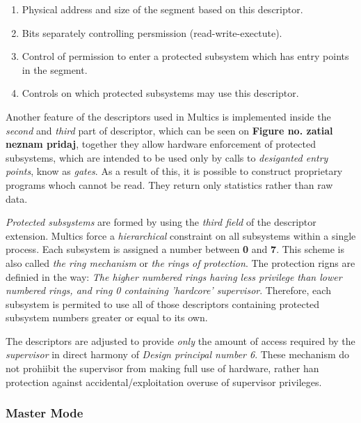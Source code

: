 
\begin{enumerate}
    \item Physical address and size of the segment based on this descriptor.
    \item Bits separately controlling persmission (read-write-exectute).
    \item Control of permission to enter a protected subsystem which has entry points in the segment.
    \item Controls on which protected subsystems may use this descriptor.
\end{enumerate}

Another feature of the descriptors used in Multics is implemented inside the \textit{second} and \textit{third} part of descriptor, 
which can be seen on \textbf{Figure no. zatial neznam pridaj}, together they allow hardware enforcement of protected subsystems, 
which are intended to be used only by calls to \textit{desiganted entry points}, know as \textit{gates}. As a result of this, 
it is possible to construct proprietary programs whoch cannot be read. They return only statistics rather than raw data.

\textit{Protected subsystems} are formed by using the \textit{third field} of the descriptor extension. Multics force a 
\textit{hierarchical} constraint on all subsystems within a single process. Each subsystem is assigned a number between 
\textbf{0} and \textbf{7}. This scheme is also called \textit{the ring mechanism} or \textit{the rings of protection}. 
The protection rigns are definied in the way:
\textit{The higher numbered rings having less privilege than lower numbered rings, and ring 0
containing 'hardcore' supervisor}. Therefore, each subsystem is permited to use all of those descriptors containing 
protected subsystem numbers greater or equal to its own.

The descriptors are adjusted to provide \textit{only} the amount of access required by the \textit{supervisor} in direct 
harmony of \textit{Design principal number 6}. These mechanism do not prohiibit the supervisor from making full use of hardware, 
rather han protection against accidental/exploitation overuse of supervisor privileges.

\subsubsection{Master Mode}

